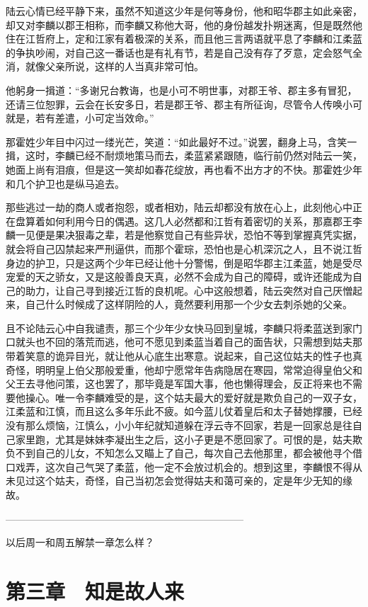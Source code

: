 陆云心情已经平静下来，虽然不知道这少年是何等身份，他和昭华郡主如此亲密，却又对李麟以郡王相称，而李麟又称他大哥，他的身份越发扑朔迷离，但是既然他住在江哲府上，定和江家有着极深的关系，而且他三言两语就平息了李麟和江柔蓝的争执吵闹，对自己这一番话也是有礼有节，若是自己没有存了歹意，定会怒气全消，就像父亲所说，这样的人当真非常可怕。

他躬身一揖道：“多谢兄台教诲，也是小可不明世事，对郡王爷、郡主多有冒犯，还请三位恕罪，云会在长安多日，若是郡王爷、郡主有所征询，尽管令人传唤小可就是，若有差遣，小可定当效命。”

那霍姓少年目中闪过一缕光芒，笑道：“如此最好不过。”说罢，翻身上马，含笑一揖，这时，李麟已经不耐烦地策马而去，柔蓝紧紧跟随，临行前仍然对陆云一笑，她面上尚有泪痕，但是这一笑却如春花绽放，再也看不出方才的不快。那霍姓少年和几个护卫也是纵马追去。

那些逃过一劫的商人或者抱怨，或者相劝，陆云却都没有放在心上，此刻他心中正在盘算着如何利用今日的偶遇。这几人必然都和江哲有着密切的关系，那嘉郡王李麟一见便是果决狠毒之辈，若是他察觉自己有些异状，恐怕不等到掌握真凭实据，就会将自己囚禁起来严刑逼供，而那个霍琮，恐怕也是心机深沉之人，且不说江哲身边的护卫，只是这两个少年已经让他十分警惕，倒是昭华郡主江柔蓝，她是受尽宠爱的天之骄女，又是这般善良天真，必然不会成为自己的障碍，或许还能成为自己的助力，让自己寻到接近江哲的良机呢。心中这般想着，陆云突然对自己厌憎起来，自己什么时候成了这样阴险的人，竟然要利用那一个少女去刺杀她的父亲。

且不论陆云心中自我谴责，那三个少年少女快马回到皇城，李麟只将柔蓝送到家门口就头也不回的落荒而逃，他可不愿见到柔蓝当着自己的面告状，只需想到姑夫那带着笑意的诡异目光，就让他从心底生出寒意。说起来，自己这位姑夫的性子也真奇怪，明明皇上伯父那般爱重，他却宁愿常年告病隐居在寒园，常常迫得皇伯父和父王去寻他问策，这也罢了，那毕竟是军国大事，他也懒得理会，反正将来也不需要他操心。唯一令李麟难受的是，这个姑夫最大的爱好就是欺负自己的一双子女，江柔蓝和江慎，而且这么多年乐此不疲。如今蓝儿仗着皇后和太子替她撑腰，已经没有那么烦恼，江慎么，小小年纪就知道躲在浮云寺不回家，若是一回家总是往自己家里跑，尤其是妹妹李凝出生之后，这小子更是不愿回家了。可恨的是，姑夫欺负不到自己的儿女，不知怎么又瞄上了自己，每次自己去他那里，都会被他寻个借口戏弄，这次自己气哭了柔蓝，他一定不会放过机会的。想到这里，李麟恨不得从未见过这个姑夫，奇怪，自己当初怎会觉得姑夫和蔼可亲的，定是年少无知的缘故。

————————————————————————

以后周一和周五解禁一章怎么样？

\chapter{第三章　知是故人来}

